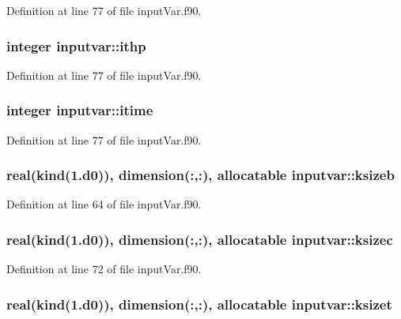 Definition at line 77 of file input\-Var.\-f90.

\hypertarget{classinputvar_abb9734f3e3ee40c97881bd03881065c5}{
\subsubsection[{ithp}]{\setlength{\rightskip}{0pt plus 5cm}integer inputvar\-::ithp}}\label{classinputvar_abb9734f3e3ee40c97881bd03881065c5}


Definition at line 77 of file input\-Var.\-f90.

\hypertarget{classinputvar_a06f760a3ae10a8b9834a7e0d270d1d59}{
\subsubsection[{itime}]{\setlength{\rightskip}{0pt plus 5cm}integer inputvar\-::itime}}\label{classinputvar_a06f760a3ae10a8b9834a7e0d270d1d59}


Definition at line 77 of file input\-Var.\-f90.

\hypertarget{classinputvar_ad8be82d5fedb76e97006462fc334ee95}{
\subsubsection[{ksizeb}]{\setlength{\rightskip}{0pt plus 5cm}real(kind(1.d0)), dimension(\-:,\-:), allocatable inputvar\-::ksizeb}}\label{classinputvar_ad8be82d5fedb76e97006462fc334ee95}


Definition at line 64 of file input\-Var.\-f90.

\hypertarget{classinputvar_a566165a1a61dae24f58f3e8e117457d4}{
\subsubsection[{ksizec}]{\setlength{\rightskip}{0pt plus 5cm}real(kind(1.d0)), dimension(\-:,\-:), allocatable inputvar\-::ksizec}}\label{classinputvar_a566165a1a61dae24f58f3e8e117457d4}


Definition at line 72 of file input\-Var.\-f90.

\hypertarget{classinputvar_a359d19cae6373fc1cdfff9739977c075}{
\subsubsection[{ksizet}]{\setlength{\rightskip}{0pt plus 5cm}real(kind(1.d0)), dimension(\-:,\-:), allocatable inputvar\-::ksizet}}\label{classinputvar_a359d19cae6373fc1cdfff9739977c075}


